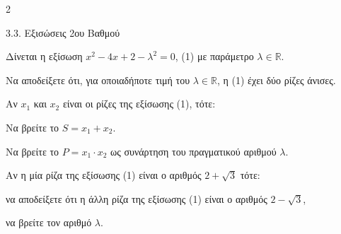 \begin{ylh}{2}
    \item 3.3. Εξισώσεις 2ου Βαθμού
\end{ylh}
Δίνεται η εξίσωση $x^2 - 4x + 2 - \lambda^2 = 0$, (1) με παράμετρο $\lambda \in \mathbb{R}$.

\begin{alist}
\item Να αποδείξετε ότι, για οποιαδήποτε τιμή του $\lambda \in \mathbb{R}$, η (1) έχει δύο ρίζες άνισες.
\item Αν $x_1$ και $x_2$ είναι οι ρίζες της εξίσωσης (1), τότε:
\begin{rlist}
\item Να βρείτε το $S = x_1 + x_2$.
\item Να βρείτε το $P = x_1 \cdot x_2$ ως συνάρτηση του πραγματικού αριθμού $\lambda$.
\end{rlist}
\item Αν η μία ρίζα της εξίσωσης (1) είναι ο αριθμός $2 + \sqrt{3}$ τότε:
\begin{rlist}
\item να αποδείξετε ότι η άλλη ρίζα της εξίσωσης (1) είναι ο αριθμός $2 - \sqrt{3}$,
\item να βρείτε τον αριθμό $\lambda$.
\end{rlist}
\end{alist}

